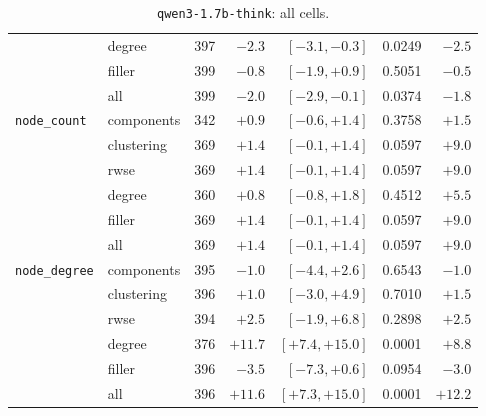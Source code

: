\begin{table}[H]
{\begin{tabular}{llrrrrr}
 & degree & 397 & $-2.3$ & $[-3.1, -0.3]$ & 0.0249 & $-2.5$ \\
 & filler & 399 & $-0.8$ & $[-1.9, +0.9]$ & 0.5051 & $-0.5$ \\
 & all & 399 & $-2.0$ & $[-2.9, -0.1]$ & 0.0374 & $-1.8$ \\
\midrule
\texttt{node\_count} & components & 342 & $+0.9$ & $[-0.6, +1.4]$ & 0.3758 & $+1.5$ \\
 & clustering & 369 & $+1.4$ & $[-0.1, +1.4]$ & 0.0597 & $+9.0$ \\
 & rwse & 369 & $+1.4$ & $[-0.1, +1.4]$ & 0.0597 & $+9.0$ \\
 & degree & 360 & $+0.8$ & $[-0.8, +1.8]$ & 0.4512 & $+5.5$ \\
 & filler & 369 & $+1.4$ & $[-0.1, +1.4]$ & 0.0597 & $+9.0$ \\
 & all & 369 & $+1.4$ & $[-0.1, +1.4]$ & 0.0597 & $+9.0$ \\
\midrule
\texttt{node\_degree} & components & 395 & $-1.0$ & $[-4.4, +2.6]$ & 0.6543 & $-1.0$ \\
 & clustering & 396 & $+1.0$ & $[-3.0, +4.9]$ & 0.7010 & $+1.5$ \\
 & rwse & 394 & $+2.5$ & $[-1.9, +6.8]$ & 0.2898 & $+2.5$ \\
 & degree & 376 & $+11.7$ & $[+7.4, +15.0]$ & 0.0001 & $+8.8$ \\
 & filler & 396 & $-3.5$ & $[-7.3, +0.6]$ & 0.0954 & $-3.0$ \\
 & all & 396 & $+11.6$ & $[+7.3, +15.0]$ & 0.0001 & $+12.2$ \\
\bottomrule
\end{tabular}}
\caption{\texttt{qwen3-1.7b-think}: all cells.}
\end{table}

